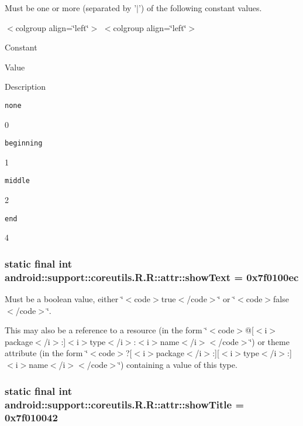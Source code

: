Must be one or more (separated by '$|$') of the following constant values. \begin{TabularC}{0}
\hline
\end{TabularC}
$<$colgroup align=\char`\"{}left\char`\"{}$>$ $<$colgroup align=\char`\"{}left\char`\"{}$>$ 

Constant

Value

Description 

{\tt none}

0

{\tt beginning}

1

{\tt middle}

2

{\tt end}

4\hypertarget{classandroid_1_1support_1_1coreutils_1_1_r_1_1attr_cf3fad8afd744b3819277f49428762d2}{
\subsubsection[{showText}]{\setlength{\rightskip}{0pt plus 5cm}static final int android::support::coreutils.R.R::attr::showText = 0x7f0100ec}}
\label{classandroid_1_1support_1_1coreutils_1_1_r_1_1attr_cf3fad8afd744b3819277f49428762d2}


Must be a boolean value, either \char`\"{}$<$code$>$true$<$/code$>$\char`\"{} or \char`\"{}$<$code$>$false$<$/code$>$\char`\"{}. 

This may also be a reference to a resource (in the form \char`\"{}$<$code$>$@\mbox{[}$<$i$>$package$<$/i$>$:\mbox{]}$<$i$>$type$<$/i$>$:$<$i$>$name$<$/i$>$$<$/code$>$\char`\"{}) or theme attribute (in the form \char`\"{}$<$code$>$?\mbox{[}$<$i$>$package$<$/i$>$:\mbox{]}\mbox{[}$<$i$>$type$<$/i$>$:\mbox{]}$<$i$>$name$<$/i$>$$<$/code$>$\char`\"{}) containing a value of this type. \hypertarget{classandroid_1_1support_1_1coreutils_1_1_r_1_1attr_b7dba8040c410734ef52a944b66c3285}{
\subsubsection[{showTitle}]{\setlength{\rightskip}{0pt plus 5cm}static final int android::support::coreutils.R.R::attr::showTitle = 0x7f010042}}
\label{classandroid_1_1support_1_1coreutils_1_1_r_1_1attr_b7dba8040c410734ef52a944b66c3285}


